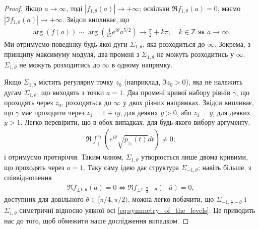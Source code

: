 \documentclass[]{article}
\begin{document}
\begin{proof}
Якщо $ a \to \infty $, тоді $ |f_{1,\theta}(a)| \to +\infty $; оскільки $ \Re f_{1,\theta}(a) = 0 $, маємо $ |\Im f_{1,\theta}(a)| \to +\infty $. Звідси випливає, що
\begin{align*}
    \arg (f(a)) \sim \arg \left( \frac{4}{15} e^{i\theta} a^{5/2} \right) \to \frac{\pi}{2} + k\pi, \quad k \in \mathbb{Z} \text{ як } a \to \infty.
\end{align*}
Ми отримуємо поведінку будь-якої дуги $ \Sigma_{1,\theta} $, яка розходиться до $ \infty $. Зокрема, з принципу максимуму модуля, два промені з $ \Sigma_{1,\theta} $ не можуть розходитись у $ \infty $. $ \Sigma_{1,\theta} $ не можуть розходитись до $ \infty $ в одному напрямку.

Якщо $ \Sigma_{1,\theta} $ містить регулярну точку $ z_0 $ (наприклад, $ \Im z_0 > 0 $), яка не належить дугам $ \Sigma_{1,\theta} $, що виходять з точки $ a = 1 $. Два промені кривої набору рівнів $ \gamma $, що проходять через $ z_0 $, розходяться до $ \infty $ у двох різних напрямках. Звідси випливає, що $ \gamma $ має проходити через $ z_1 = 1 + iy $, для деяких $ y > 0 $, або $ z_1 = y $, для деяких $ y > 1 $. Легко перевірити, що в обох випадках, для будь-якого вибору аргументу,
\begin{align*}
    \Re \int_1^{z_1} \left( e^{i\theta} \sqrt{p_{z_1}(t)} dt \right) \neq 0;
\end{align*}
і отримуємо протиріччя. Таким чином, $ \Sigma_{1,\theta} $ утворюється лише двома кривими, що проходять через $ a = 1 $. Таку саму ідею дає структура $ \Sigma_{-1,\theta} $; навіть більше, з співвідношення
\begin{align}\label{eq:symmetry_of_the_levels}
    \Re f_{\pm1,\theta}(a) = 0 \iff \Re f_{\pm1,\frac{\pi}{2}-\theta}(-\overline{a}) = 0,
\end{align}
доступних для довільного $ \theta \in [\pi/4, \pi/2) $, можна легко побачити, що $ \Sigma_{-1,\frac{\pi}{2}-\theta} $ і $ \Sigma_{1,\theta} $ симетричні відносно уявної осі \eqref{eq:symmetry_of_the_levels}. Це приводить нас до того, щоб обмежити наше дослідження випадком.
\end{proof}
\end{document}
